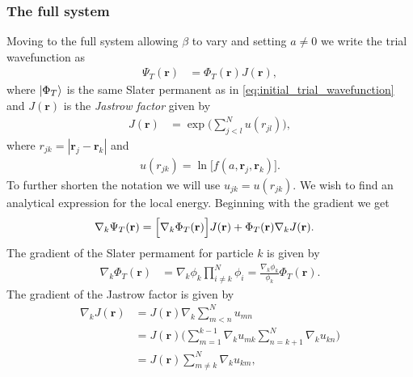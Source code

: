 \documentclass[
    a4paper, aps, twocolumn, floatfix, superscriptaddress, nofootinbib]{revtex4-1}
\newcommand{\vf}{\mathbf}
\newcommand{\1}{\mathds{1}}
\begin{document}
        \subsubsection{The full system}
            Moving to the full system allowing $\beta$ to vary and setting $a
            \neq 0$ we write the trial wavefunction as
            \begin{align}
                \Psi_T(\vf{r})
                &=
                \Phi_T(\vf{r})
                J(\vf{r}),
            \end{align}
            where $\ket{\Phi_T}$ is the same Slater permanent as in
            \autoref{eq:initial_trial_wavefunction} and $J(\vf{r})$ is the
            \textit{Jastrow factor} given by
            \begin{align}
                J(\vf{r})
                &=
                \exp\Biggl(
                    \sum_{j < l}^N u(r_{jl})
                \Biggr),
            \end{align}
            where $r_{jk} = |\vf{r}_j - \vf{r}_k|$ and
            \begin{align}
                u(r_{jk}) = \ln\bigl[f(a, \vf{r}_j, \vf{r}_k)\bigr].
            \end{align}
            To further shorten the notation we will use $u_{jk} = u(r_{jk})$.
            We wish to find an analytical expression for the local energy.
            Beginning with the gradient we get
            \begin{align}
                \nabla_k\Psi_T(\vf{r})
                &=
                \Bigl[
                    \nabla_k
                    \Phi_T(\vf{r})
                \Bigr]
                J(\vf{r})
                + \Phi_T(\vf{r})
                \nabla_k J(\vf{r}).
            \end{align}
            The gradient of the Slater permament for particle $k$ is given by
            \begin{align}
                \nabla_k
                \Phi_T(\vf{r})
                &=
                \nabla_k\phi_k
                \prod_{i \neq k}^N\phi_i
                = \frac{\nabla_k\phi_k}{\phi_k}
                \Phi_T(\vf{r}).
            \end{align}
            The gradient of the Jastrow factor is given by
            \begin{align}
                \nabla_k J(\vf{r})
                &=
                J(\vf{r})
                \nabla_k\sum_{m < n}^N u_{mn} \\
                &= J(\vf{r})
                \Biggl(
                    \sum_{m = 1}^{k - 1}\nabla_k u_{mk}
                    \sum_{n = k + 1}^N\nabla_k u_{kn}
                \Biggr)
                \\
                &=
                J(\vf{r})
                \sum_{m \neq k}^N\nabla_k u_{km},
            \end{align}
\end{document}
